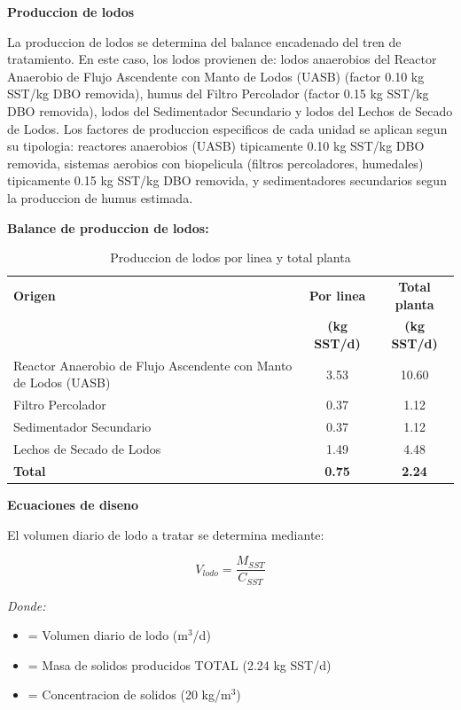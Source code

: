 \documentclass[12pt,a4paper]{article}
\begin{document}
\textbf{Produccion de lodos}

La produccion de lodos se determina del balance encadenado del tren de tratamiento. En este caso, los lodos provienen de: lodos anaerobios del Reactor Anaerobio de Flujo Ascendente con Manto de Lodos (UASB) (factor 0.10 kg SST/kg DBO removida), humus del Filtro Percolador (factor 0.15 kg SST/kg DBO removida), lodos del Sedimentador Secundario y lodos del Lechos de Secado de Lodos. Los factores de produccion especificos de cada unidad se aplican segun su tipologia: reactores anaerobios (UASB) tipicamente 0.10 kg SST/kg DBO removida, sistemas aerobios con biopelicula (filtros percoladores, humedales) tipicamente 0.15 kg SST/kg DBO removida, y sedimentadores secundarios segun la produccion de humus estimada.

\textbf{Balance de produccion de lodos:}

\begin{table}[H]
\centering
\small
\caption{Produccion de lodos por linea y total planta}
\begin{tabular}{p{6cm}cc}
\toprule
\textbf{Origen} & \textbf{Por linea} & \textbf{Total planta} \\
 & \textbf{(kg SST/d)} & \textbf{(kg SST/d)} \\
\midrule
Reactor Anaerobio de Flujo Ascendente con Manto de Lodos (UASB) & 3.53 & 10.60 \\
Filtro Percolador & 0.37 & 1.12 \\
Sedimentador Secundario & 0.37 & 1.12 \\
Lechos de Secado de Lodos & 1.49 & 4.48 \\
\midrule
\textbf{Total} & \textbf{0.75} & \textbf{2.24} \\
\bottomrule
\end{tabular}
\end{table}

\textbf{Ecuaciones de diseno}

El volumen diario de lodo a tratar se determina mediante:

\begin{equation}
V_{lodo} = \frac{M_{SST}}{C_{SST}}
\end{equation}

\textit{Donde:}
\begin{itemize}[noitemsep,leftmargin=2em]
    \item[$V_{lodo}$] = Volumen diario de lodo (m$^3$/d)
    \item[$M_{SST}$] = Masa de solidos producidos TOTAL (2.24 kg SST/d)
    \item[$C_{SST}$] = Concentracion de solidos (20 kg/m$^3$)
\end{itemize}
\end{document}
